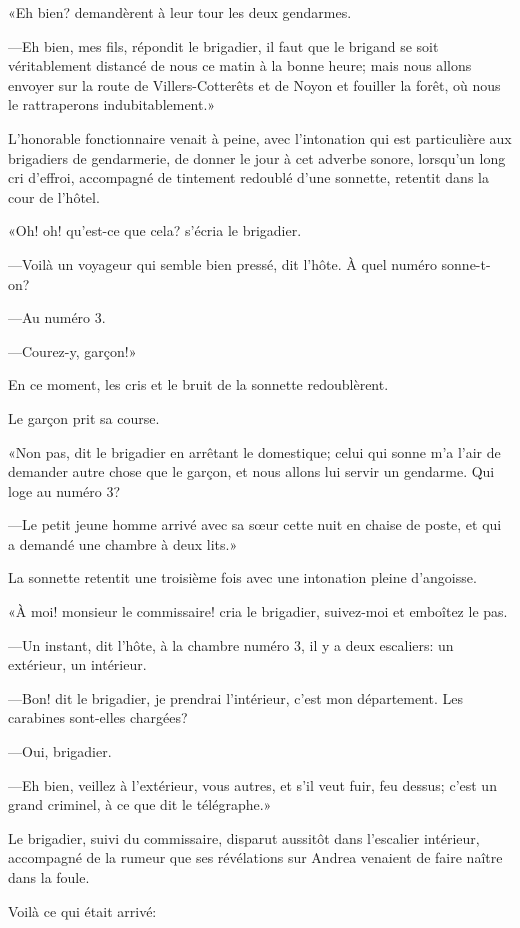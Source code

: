 «Eh bien? demandèrent à leur tour les deux gendarmes. 

—Eh bien, mes fils, répondit le brigadier, il faut que le brigand se soit véritablement distancé de nous ce matin à la bonne heure; mais nous allons envoyer sur la route de Villers-Cotterêts et de Noyon et fouiller la forêt, où nous le rattraperons indubitablement.» 

L'honorable fonctionnaire venait à peine, avec l'intonation qui est particulière aux brigadiers de gendarmerie, de donner le jour à cet adverbe sonore, lorsqu'un long cri d'effroi, accompagné de tintement redoublé d'une sonnette, retentit dans la cour de l'hôtel. 

«Oh! oh! qu'est-ce que cela? s'écria le brigadier. 

—Voilà un voyageur qui semble bien pressé, dit l'hôte. À quel numéro sonne-t-on? 

—Au numéro 3. 

—Courez-y, garçon!» 

En ce moment, les cris et le bruit de la sonnette redoublèrent. 

Le garçon prit sa course. 

«Non pas, dit le brigadier en arrêtant le domestique; celui qui sonne m'a l'air de demander autre chose que le garçon, et nous allons lui servir un gendarme. Qui loge au numéro 3? 

—Le petit jeune homme arrivé avec sa sœur cette nuit en chaise de poste, et qui a demandé une chambre à deux lits.» 

La sonnette retentit une troisième fois avec une intonation pleine d'angoisse. 

«À moi! monsieur le commissaire! cria le brigadier, suivez-moi et emboîtez le pas. 

—Un instant, dit l'hôte, à la chambre numéro 3, il y a deux escaliers: un extérieur, un intérieur. 

—Bon! dit le brigadier, je prendrai l'intérieur, c'est mon département. Les carabines sont-elles chargées? 

—Oui, brigadier. 

—Eh bien, veillez à l'extérieur, vous autres, et s'il veut fuir, feu dessus; c'est un grand criminel, à ce que dit le télégraphe.» 

Le brigadier, suivi du commissaire, disparut aussitôt dans l'escalier intérieur, accompagné de la rumeur que ses révélations sur Andrea venaient de faire naître dans la foule. 

Voilà ce qui était arrivé: 

